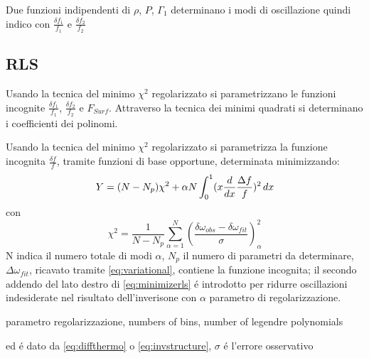 \documentclass[../main.tex]{subfiles}
\begin{document}
\begin{workout}

Due funzioni indipendenti di $\rho$, $P$, $\Gamma_1$ determinano i modi di oscillazione quindi indico con $\frac{\delta f_1}{f_1}$ e $\frac{\delta f_2}{f_2}$

\end{workout}

\subsection{RLS}

\begin{workout}

Usando la tecnica del minimo $\chi^2$ regolarizzato si parametrizzano le funzioni incognite $\frac{\delta f_1}{f_1}$, $\frac{\delta f_2}{f_2}$ e $F_{Surf}$. Attraverso la tecnica dei minimi quadrati si determinano i coefficienti dei polinomi.

\end{workout}

Usando la tecnica del minimo $\chi^2$ regolarizzato si parametrizza la funzione incognita $\frac{\delta f}{f}$, tramite funzioni di base opportune, determinata minimizzando:
\begin{equation}
Y=(N-N_p)\chi^2+\alpha N\int_0^1(x\frac{d}{d x}\frac{\Delta f}{f})^2\,dx\label{eq:minimizerls}
\end{equation}
con
\begin{equation}
\chi^2=\frac{1}{N-N_p}\sum_{\alpha=1}^N(\frac{\delta\omega_{obs}-\delta\omega_{fit}}{\sigma})^2_{\alpha}
\end{equation}
N indica il numero totale di modi $\alpha$, $N_p$ il numero di parametri da determinare, $\Delta\omega_{fit}$, ricavato tramite \eqref{eq:variational}, contiene la funzione incognita; il secondo addendo del lato destro di \eqref{eq:minimizerls} \'e introdotto per ridurre oscillazioni indesiderate nel risultato dell'inverisone con $\alpha$ parametro di regolarizzazione.

\begin{workout}
parametro regolarizzazione, numbers of bins, number of legendre polynomials
\end{workout}

\begin{workout}
ed \'e dato da \eqref{eq:diffthermo} o \eqref{eq:invstructure}, $\sigma$ \'e l'errore osservativo
\end{workout}
\end{document}
